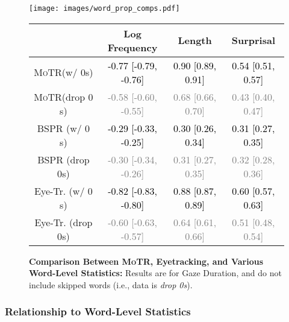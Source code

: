 \documentclass[12pt]{article}
\newcommand{\motr}{\textsc{MoTR}\xspace}
\newcommand{\redcell}[1]{\textcolor{black}{#1}}
\newcommand{\greencell}[1]{\textcolor{gray}{#1}}
\begin{document}
{\begin{figure}[]
    \centering
    \begin{minipage}{\textwidth}
    \centering
    \small
    \texttt{[image: images/word\_prop\_comps.pdf]}
    \vspace{-0.8cm}
    \caption{ \small \textbf{Comparison Between \motr, Eyetracking, and Various Word-Level Statistics:} Results are for Gaze Duration, and do not include skipped words (i.e., data is \emph{drop 0s}).}
    \label{fig:word-comp}
    \end{minipage}
    \vspace{0.5cm}
    \begin{tabular}{ c | c | c | c }
    \toprule
         & Log Frequency & Length & Surprisal \\
    \midrule
        \motr (w/ $0$s) & \redcell{-0.77 [-0.79, -0.76]} & \redcell{0.90 [0.89, 0.91]} & \redcell{0.54 [0.51, 0.57]} \\
        \motr (drop $0$s) & \greencell{-0.58 [-0.60, -0.55]} & \greencell{0.68 [0.66, 0.70]} & \greencell{0.43 [0.40, 0.47]} \\
        \midrule
        BSPR (w/ $0$s) & \redcell{-0.29 [-0.33, -0.25]} & \redcell{0.30 [0.26, 0.34]} & \redcell{0.31 [0.27, 0.35]} \\
        BSPR (drop $0$s) & \greencell{-0.30 [-0.34, -0.26]} & \greencell{0.31 [0.27, 0.35]} & \greencell{0.32 [0.28, 0.36]} \\
        \midrule
        Eye-Tr. (w/ $0$s) & \redcell{-0.82 [-0.83, -0.80]} & \redcell{0.88 [0.87, 0.89]} & \redcell{0.60 [0.57, 0.63]} \\
        Eye-Tr. (drop $0$s) & \greencell{-0.60 [-0.63, -0.57]} & \greencell{0.64 [0.61, 0.66]} & \greencell{0.51 [0.48, 0.54]} \\
    \bottomrule
    \end{tabular}
    \label{tab:stat_cors}
\end{figure}

\subsubsection{Relationship to Word-Level Statistics}

}
\end{document}
